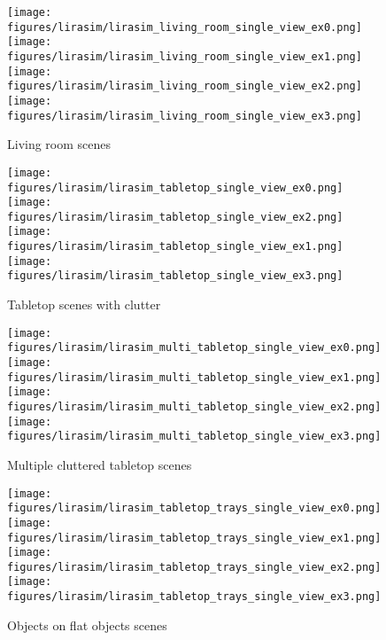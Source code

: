 \begin{figure*}
\centering
\newlength\ImageHeight
\ImageHeight=31mm
\newlength\SubfigWidth
{}\textwidth

\begin{subfigure}[b]{\SubfigWidth}
    \centering
    \texttt{[image: figures/lirasim/lirasim\_living\_room\_single\_view\_ex0.png]} \texttt{[image: figures/lirasim/lirasim\_living\_room\_single\_view\_ex1.png]} \texttt{[image: figures/lirasim/lirasim\_living\_room\_single\_view\_ex2.png]}
    \texttt{[image: figures/lirasim/lirasim\_living\_room\_single\_view\_ex3.png]}
    \caption{Living room scenes}
    \label{fig:lirasim_living_room_single_view}
\end{subfigure}
\begin{subfigure}[b]{\SubfigWidth}
    \centering
    \texttt{[image: figures/lirasim/lirasim\_tabletop\_single\_view\_ex0.png]} \texttt{[image: figures/lirasim/lirasim\_tabletop\_single\_view\_ex2.png]} \texttt{[image: figures/lirasim/lirasim\_tabletop\_single\_view\_ex1.png]} \texttt{[image: figures/lirasim/lirasim\_tabletop\_single\_view\_ex3.png]}
    \caption{Tabletop scenes with clutter}
    \label{fig:lirasim_tabletop_single_view}
\end{subfigure}

\begin{subfigure}[b]{\SubfigWidth}
    \centering
    \texttt{[image: figures/lirasim/lirasim\_multi\_tabletop\_single\_view\_ex0.png]} \texttt{[image: figures/lirasim/lirasim\_multi\_tabletop\_single\_view\_ex1.png]} \texttt{[image: figures/lirasim/lirasim\_multi\_tabletop\_single\_view\_ex2.png]} \texttt{[image: figures/lirasim/lirasim\_multi\_tabletop\_single\_view\_ex3.png]}
    \caption{Multiple cluttered tabletop scenes}
    \label{fig:lirasim_multi_tabletop_single_view}
\end{subfigure}
\begin{subfigure}[b]{\SubfigWidth}
    \centering
    \texttt{[image: figures/lirasim/lirasim\_tabletop\_trays\_single\_view\_ex0.png]} \texttt{[image: figures/lirasim/lirasim\_tabletop\_trays\_single\_view\_ex1.png]} \texttt{[image: figures/lirasim/lirasim\_tabletop\_trays\_single\_view\_ex2.png]} \texttt{[image: figures/lirasim/lirasim\_tabletop\_trays\_single\_view\_ex3.png]}
    \caption{Objects on flat objects scenes}
    \label{fig:lirasim_tabletop_trays_single_view}
\end{subfigure}
\label{fig:proc_3dbbx_examples}
\end{figure*}

